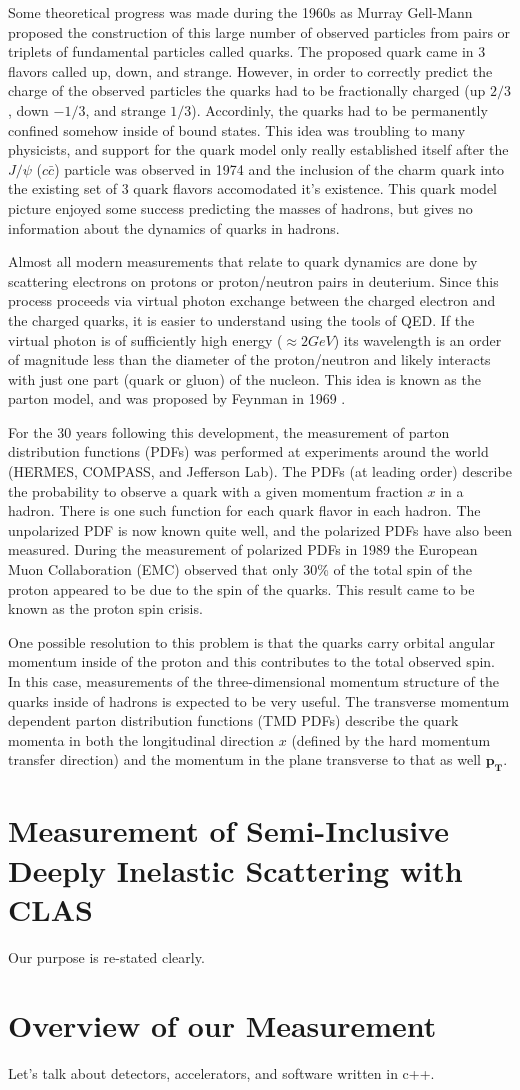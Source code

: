 Some theoretical progress was made during the 1960s as Murray Gell-Mann proposed the construction of this large number of observed particles from pairs or triplets of fundamental particles called quarks.  The proposed quark came in 3 flavors called up, down, and strange.  However, in order to correctly predict the charge of the observed particles the quarks had to be fractionally charged (up $2/3$, down $-1/3$, and strange $1/3$).  Accordinly, the quarks had to be permanently confined somehow inside of bound states.  This idea was troubling to many physicists, and support for the quark model only really established itself after the $J/\psi$ ($c \bar{c}$) particle was observed in 1974 and the inclusion of the charm quark into the existing set of 3 quark flavors accomodated it's existence.  This quark model picture enjoyed some success predicting the masses of hadrons, but gives no information about the dynamics of quarks in hadrons.

Almost all modern measurements that relate to quark dynamics are done by scattering electrons on protons or proton/neutron pairs in deuterium.  Since this process proceeds via virtual photon exchange between the charged electron and the charged quarks, it is easier to understand using the tools of QED.  If the virtual photon is of sufficiently high energy ($\approx 2 GeV$) its wavelength is an order of magnitude less than the diameter of the proton/neutron and likely interacts with just one part (quark or gluon) of the nucleon.  This idea is known as the parton model, and was proposed by Feynman in 1969 \cite{history-feynman:1969}.

For the 30 years following this development, the measurement of parton distribution functions (PDFs) was performed at experiments around the world (HERMES, COMPASS, and Jefferson Lab).  The PDFs (at leading order) describe the probability to observe a quark with a given momentum fraction $x$ in a hadron.  There is one such function for each quark flavor in each hadron.  The unpolarized PDF is now known quite well, and the polarized PDFs have also been measured.  During the measurement of polarized PDFs in 1989 the European Muon Collaboration (EMC) observed that only 30\% of the total spin of the proton appeared to be due to the spin of the quarks.  This result came to be known as the proton spin crisis.  

One possible resolution to this problem is that the quarks carry orbital angular momentum inside of the proton and this contributes to the total observed spin.  In this case, measurements of the three-dimensional momentum structure of the quarks inside of hadrons is expected to be very useful.  The transverse momentum dependent parton distribution functions (TMD PDFs) describe the quark momenta in both the longitudinal direction $x$ (defined by the hard momentum transfer direction) and the momentum in the plane transverse to that as well $\mathbf{p_T}$.  

\section{Measurement of Semi-Inclusive Deeply Inelastic Scattering with CLAS}
Our purpose is re-stated clearly.

\section{Overview of our Measurement}
Let's talk about detectors, accelerators, and software written in c++. 

